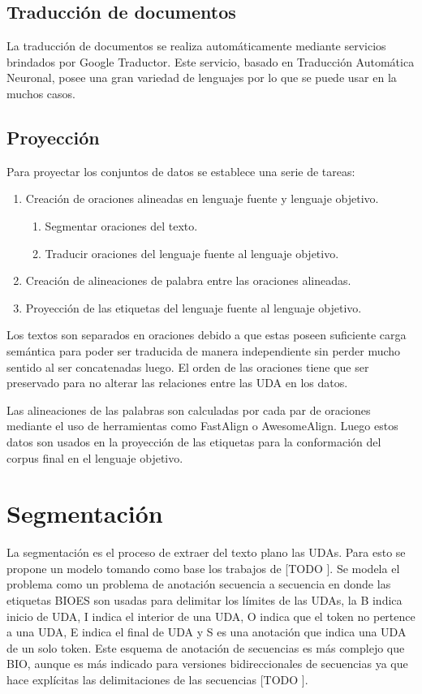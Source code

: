 \subsection{Traducción de documentos}

La traducción de documentos se realiza automáticamente mediante servicios brindados por Google Traductor.
Este servicio, basado en Traducción Automática Neuronal, posee una gran variedad de lenguajes por lo que
se puede usar en la muchos casos.

\subsection{Proyección}

Para proyectar los conjuntos de datos se establece una serie de tareas:

\begin{enumerate}
    \item Creación de oraciones alineadas en lenguaje fuente y lenguaje objetivo.
    \begin{enumerate}
        \item Segmentar oraciones del texto.
        \item Traducir oraciones del lenguaje fuente al lenguaje objetivo.
    \end{enumerate}
    \item Creación de alineaciones de palabra entre las oraciones alineadas.
    \item Proyección de las etiquetas del lenguaje fuente al lenguaje objetivo. 
\end{enumerate}

Los textos son separados en oraciones debido a que estas poseen suficiente carga semántica
para poder ser traducida de manera independiente sin perder mucho sentido al ser concatenadas
luego. El orden de las oraciones tiene que ser preservado para no alterar las relaciones entre 
las UDA en los datos. 

Las alineaciones de las palabras son calculadas por cada par de oraciones mediante el uso de 
herramientas como FastAlign o AwesomeAlign. Luego estos datos son usados en la proyección de 
las etiquetas para la conformación del corpus final en el lenguaje objetivo.

\section{Segmentación}

La segmentación es el proceso de extraer del texto plano las UDAs. Para esto se propone un modelo
tomando como base los trabajos de [TODO \cite{}]. Se modela el problema como un problema de anotación
secuencia a secuencia en donde las etiquetas BIOES son usadas para delimitar los límites de las 
UDAs, la B indica inicio de UDA, I indica el interior de una UDA, O indica que el token no pertence
a una UDA, E indica el final de UDA y S es una anotación que indica una UDA de un solo token. 
Este esquema de anotación de secuencias es más complejo que BIO, aunque es más indicado
para versiones bidireccionales de secuencias ya que hace explícitas las delimitaciones de las 
secuencias [TODO \cite{}].

